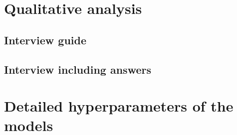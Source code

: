 









\chapter{Qualitative analysis}
\label{app:Qualitative-analysis}

\section{Interview guide}
\label{sec:Interview-Guide}



\section{Interview including answers}
\label{sec:Interview-Answers}



\chapter{Detailed hyperparameters of the models}
\label{app:detailed-hyperparameters}

